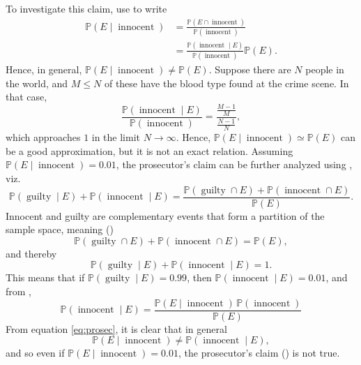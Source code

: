 \begin{example}
	To investigate this claim, use  to write
	\begin{equation}
		\begin{split}
			\mathbb{P}(E \mid \operatorname{innocent}) &= \frac{\mathbb{P}(E \cap \operatorname{innocent})}{\mathbb{P}(\operatorname{innocent})} \\
			&= \frac{\mathbb{P}(\operatorname{innocent} \mid E)}{\mathbb{P}(\operatorname{innocent})} \mathbb{P}(E).
		\end{split}
	\end{equation}
	Hence, in general, $\mathbb{P}(E \mid \operatorname{innocent}) \neq \mathbb{P}(E)$. Suppose there are $N$ people in the world, and $M \leq N$ of these have the blood type found at the crime scene. In that case,
	\begin{equation}
		\frac{\mathbb{P}(\operatorname{innocent} \mid E)}{\mathbb{P}(\operatorname{innocent})} = \frac{\frac{M-1}{M}}{\frac{N-1}{N}},
	\end{equation}
	which approaches $1$ in the limit $N \rightarrow \infty$. Hence, $\mathbb{P}(E \mid \operatorname{innocent}) \simeq \mathbb{P}(E)$ can be a good approximation, but it is not an exact relation.\newline 
	Assuming $\mathbb{P}(E \mid \operatorname{innocent}) = 0.01$, the prosecutor's claim can be further analyzed using , viz.
	\begin{equation}
		\mathbb{P}(\operatorname{guilty} \mid E) + \mathbb{P}(\operatorname{innocent} \mid E) = \frac{\mathbb{P}(\operatorname{guilty} \cap E) + \mathbb{P}(\operatorname{innocent} \cap E)}{\mathbb{P}(E)}.
	\end{equation}
	Innocent and guilty are complementary events that form a partition of the sample space, meaning ()
	\begin{equation}
		\mathbb{P}(\operatorname{guilty} \cap E) + \mathbb{P}(\operatorname{innocent} \cap E) = \mathbb{P}(E),
	\end{equation}
	and thereby
	\begin{equation}
		\mathbb{P}(\operatorname{guilty} \mid E) + \mathbb{P}(\operatorname{innocent} \mid E) = 1.
	\end{equation}
	This means that if $\mathbb{P}(\operatorname{guilty} \mid E) = 0.99$, then $\mathbb{P}(\operatorname{innocent} \mid E) = 0.01$, and from ,
	\begin{equation}
			\mathbb{P}(\operatorname{innocent} \mid E) = \frac{\mathbb{P}(E \mid \operatorname{innocent}) \, \mathbb{P}(\operatorname{innocent})}{\mathbb{P}(E)}
		\label{eq:prosec}
	\end{equation}
	From equation \eqref{eq:prosec}, it is clear that in general
	\begin{equation}
		\mathbb{P}(E \mid \operatorname{innocent}) \neq \mathbb{P}(\operatorname{innocent} \mid E),
	\end{equation}
	and so even if $\mathbb{P}(E \mid \operatorname{innocent}) = 0.01$, the prosecutor's claim () is not true.
\end{example}


